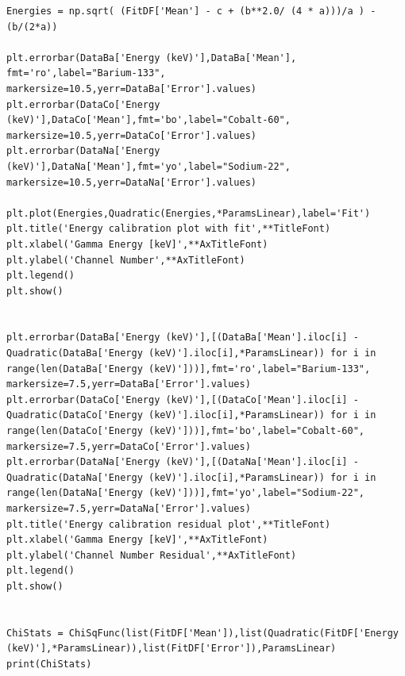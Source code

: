 \documentclass[11pt,a4paper]{article}
\begin{document}
\begin{verbatim}
Energies = np.sqrt( (FitDF['Mean'] - c + (b**2.0/ (4 * a)))/a ) - (b/(2*a))

plt.errorbar(DataBa['Energy (keV)'],DataBa['Mean'], fmt='ro',label="Barium-133", markersize=10.5,yerr=DataBa['Error'].values)
plt.errorbar(DataCo['Energy (keV)'],DataCo['Mean'],fmt='bo',label="Cobalt-60", markersize=10.5,yerr=DataCo['Error'].values)
plt.errorbar(DataNa['Energy (keV)'],DataNa['Mean'],fmt='yo',label="Sodium-22", markersize=10.5,yerr=DataNa['Error'].values)

plt.plot(Energies,Quadratic(Energies,*ParamsLinear),label='Fit')
plt.title('Energy calibration plot with fit',**TitleFont)
plt.xlabel('Gamma Energy [keV]',**AxTitleFont)
plt.ylabel('Channel Number',**AxTitleFont)
plt.legend()
plt.show()


plt.errorbar(DataBa['Energy (keV)'],[(DataBa['Mean'].iloc[i] - Quadratic(DataBa['Energy (keV)'].iloc[i],*ParamsLinear)) for i in range(len(DataBa['Energy (keV)']))],fmt='ro',label="Barium-133", markersize=7.5,yerr=DataBa['Error'].values)
plt.errorbar(DataCo['Energy (keV)'],[(DataCo['Mean'].iloc[i] - Quadratic(DataCo['Energy (keV)'].iloc[i],*ParamsLinear)) for i in range(len(DataCo['Energy (keV)']))],fmt='bo',label="Cobalt-60", markersize=7.5,yerr=DataCo['Error'].values)
plt.errorbar(DataNa['Energy (keV)'],[(DataNa['Mean'].iloc[i] - Quadratic(DataNa['Energy (keV)'].iloc[i],*ParamsLinear)) for i in range(len(DataNa['Energy (keV)']))],fmt='yo',label="Sodium-22", markersize=7.5,yerr=DataNa['Error'].values)
plt.title('Energy calibration residual plot',**TitleFont)
plt.xlabel('Gamma Energy [keV]',**AxTitleFont)
plt.ylabel('Channel Number Residual',**AxTitleFont)
plt.legend()
plt.show()


ChiStats = ChiSqFunc(list(FitDF['Mean']),list(Quadratic(FitDF['Energy (keV)'],*ParamsLinear)),list(FitDF['Error']),ParamsLinear)
print(ChiStats)
\end{verbatim}
\clearpage
\end{document}
